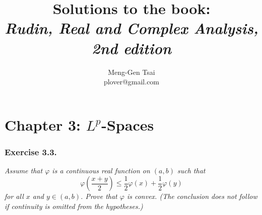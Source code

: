 \documentclass{article}
\title{\textbf{Solutions to the book: \\ \emph{Rudin, Real and Complex Analysis, 2nd edition}}}
\author{Meng-Gen Tsai \\ plover@gmail.com}
\begin{document}
\maketitle
\tableofcontents












\newpage
\section*{Chapter 3: $L^p$-Spaces \\}



\subsubsection*{Exercise 3.3.}
\emph{Assume that $\varphi$ is a continuous real function on $(a,b)$ such that
\[
  \varphi\left(\frac{x+y}{2}\right)
  \leq
  \frac{1}{2} \varphi(x) + \frac{1}{2} \varphi(y)
\]
for all $x$ and $y \in (a,b)$.
Prove that $\varphi$ is convex.
(The conclusion does not follow if continuity is omitted from the hypotheses.)} \\
\end{document}
